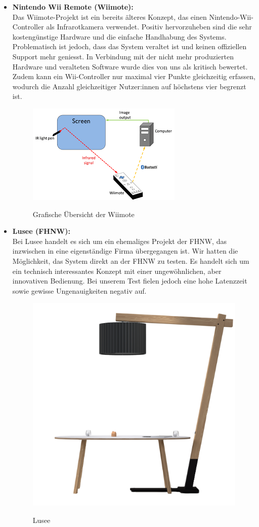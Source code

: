 \begin{itemize}
  \item \textbf{Nintendo Wii Remote (Wiimote):}\\
  Das Wiimote-Projekt ist ein bereits älteres Konzept, das einen Nintendo-Wii-Controller als Infrarotkamera verwendet. Positiv hervorzuheben sind die sehr kostengünstige Hardware und die einfache Handhabung des Systems. Problematisch ist jedoch, dass das System veraltet ist und keinen offiziellen Support mehr geniesst. In Verbindung mit der nicht mehr produzierten Hardware und veralteten Software wurde dies von uns als kritisch bewertet. Zudem kann ein Wii-Controller nur maximal vier Punkte gleichzeitig erfassen, wodurch die Anzahl gleichzeitiger Nutzer:innen auf höchstens vier begrenzt ist.\\
  \cite{wiimote}
  \begin{figure}[H]
      \centering
      \includegraphics[width=0.5\linewidth]{graphics/wiimote.png}
      \caption{Grafische Übersicht der Wiimote}
      \cite{wiimote_image}
      \label{fig:wiimote}
  \end{figure}

  \item \textbf{Lusee (FHNW):}\\
  Bei Lusee handelt es sich um ein ehemaliges Projekt der FHNW, das inzwischen in eine eigenständige Firma übergegangen ist. Wir hatten die Möglichkeit, das System direkt an der FHNW zu testen. Es handelt sich um ein technisch interessantes Konzept mit einer ungewöhnlichen, aber innovativen Bedienung. Bei unserem Test fielen jedoch eine hohe Latenzzeit sowie gewisse Ungenauigkeiten negativ auf.\\
  \cite{lusee_hardware}
  \begin{figure}[H]
      \centering
      \includegraphics[width=0.4\linewidth]{graphics/lusee.png}
      \caption{Lusee}
      \cite{lusee_hardware}
      \label{fig:lusee}
  \end{figure}
\end{itemize}

